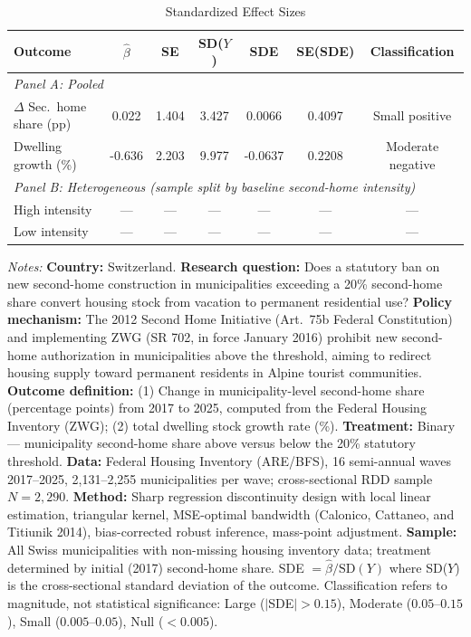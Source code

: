 \begin{table}[htbp]
\centering
\begin{threeparttable}
\caption{Standardized Effect Sizes}
\label{tab:sde}
\begin{tabular}{lcccccc}
\toprule
Outcome & $\hat{\beta}$ & SE & SD($Y$) & SDE & SE(SDE) & Classification \\
\midrule
\multicolumn{7}{l}{\textit{Panel A: Pooled}} \\
$\Delta$ Sec.\ home share (pp) & 0.022 & 1.404 & 3.427 & 0.0066 & 0.4097 & Small positive \\
Dwelling growth (\%) & -0.636 & 2.203 & 9.977 & -0.0637 & 0.2208 & Moderate negative \\
\midrule
\multicolumn{7}{l}{\textit{Panel B: Heterogeneous (sample split by baseline second-home intensity)}} \\
High intensity & --- & --- & --- & --- & --- & --- \\
Low intensity & --- & --- & --- & --- & --- & --- \\
\bottomrule
\end{tabular}
\begin{tablenotes}[flushleft]
\small
\item \textit{Notes:} \textbf{Country:} Switzerland. \textbf{Research question:} Does a statutory ban on new second-home construction in municipalities exceeding a 20\% second-home share convert housing stock from vacation to permanent residential use? \textbf{Policy mechanism:} The 2012 Second Home Initiative (Art.\ 75b Federal Constitution) and implementing ZWG (SR 702, in force January 2016) prohibit new second-home authorization in municipalities above the threshold, aiming to redirect housing supply toward permanent residents in Alpine tourist communities. \textbf{Outcome definition:} (1) Change in municipality-level second-home share (percentage points) from 2017 to 2025, computed from the Federal Housing Inventory (ZWG); (2) total dwelling stock growth rate (\%). \textbf{Treatment:} Binary --- municipality second-home share above versus below the 20\% statutory threshold. \textbf{Data:} Federal Housing Inventory (ARE/BFS), 16 semi-annual waves 2017--2025, 2,131--2,255 municipalities per wave; cross-sectional RDD sample $N = 2{,}290$. \textbf{Method:} Sharp regression discontinuity design with local linear estimation, triangular kernel, MSE-optimal bandwidth (Calonico, Cattaneo, and Titiunik 2014), bias-corrected robust inference, mass-point adjustment. \textbf{Sample:} All Swiss municipalities with non-missing housing inventory data; treatment determined by initial (2017) second-home share. SDE $= \hat{\beta} / \text{SD}(Y)$ where SD($Y$) is the cross-sectional standard deviation of the outcome. Classification refers to magnitude, not statistical significance: Large ($|$SDE$| > 0.15$), Moderate ($0.05$--$0.15$), Small ($0.005$--$0.05$), Null ($< 0.005$).
\end{tablenotes}
\end{threeparttable}
\end{table}
